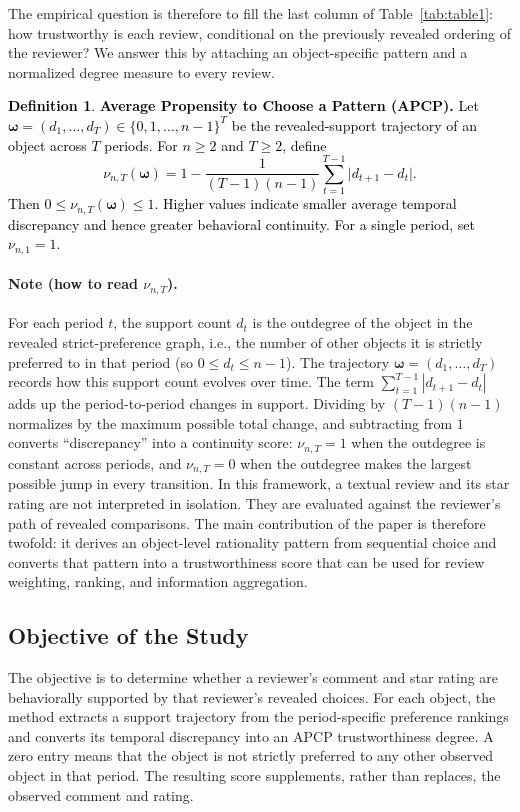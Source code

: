 \documentclass[conference]{IEEEtran}
\theoremstyle{plain}
\theoremstyle{definition}
\newtheorem{definition}{Definition}
\theoremstyle{remark}
\begin{document}
	The empirical question is therefore to fill the last column of Table~\ref{tab:table1}: how trustworthy is each review, conditional on the previously revealed ordering of the reviewer? We answer this by attaching an object-specific pattern and a normalized degree measure to every review.
		\textcolor{black}{\begin{definition}
				\textbf{Average Propensity to Choose a Pattern (APCP).} Let $\boldsymbol\omega=(d_1,\ldots,d_T)\in\{0,1,\ldots,n-1\}^{T}$ be the revealed-support trajectory of an object across $T$ periods. For $n\geq2$ and $T\geq2$, define
				\[
				\nu_{n,T}(\boldsymbol\omega)
				=1-\frac{1}{(T-1)(n-1)}
				\sum_{t=1}^{T-1}\lvert d_{t+1}-d_t\rvert.
				\]
				Then $0\leq\nu_{n,T}(\boldsymbol\omega)\leq1$. Higher values indicate smaller average temporal discrepancy and hence greater behavioral continuity. For a single period, set $\nu_{n,1}=1$.
		\end{definition}}
	\paragraph{Note (how to read $\nu_{n,T}$).} For each period $t$, the support count $d_t$ is the outdegree of the object in the revealed strict-preference graph, i.e., the number of other objects it is strictly preferred to in that period (so $0\le d_t\le n-1$). The trajectory $\boldsymbol\omega=(d_1,\ldots,d_T)$ records how this support count evolves over time. The term $\sum_{t=1}^{T-1}|d_{t+1}-d_t|$ adds up the period-to-period changes in support. Dividing by $(T-1)(n-1)$ normalizes by the maximum possible total change, and subtracting from $1$ converts ``discrepancy'' into a continuity score: $\nu_{n,T}=1$ when the outdegree is constant across periods, and $\nu_{n,T}=0$ when the outdegree makes the largest possible jump in every transition.
	In this framework, a textual review and its star rating are not interpreted in isolation. They are evaluated against the reviewer’s path of revealed comparisons. The main contribution of the paper is therefore twofold: it derives an object-level rationality pattern from sequential choice and converts that pattern into a trustworthiness score that can be used for review weighting, ranking, and information aggregation.
		\subsection{Objective of the Study}
		The objective is to determine whether a reviewer's comment and star rating are behaviorally supported by that reviewer's revealed choices. For each object, the method extracts a support trajectory from the period-specific preference rankings and converts its temporal discrepancy into an APCP trustworthiness degree. A zero entry means that the object is not strictly preferred to any other observed object in that period. The resulting score supplements, rather than replaces, the observed comment and rating.
\end{document}
